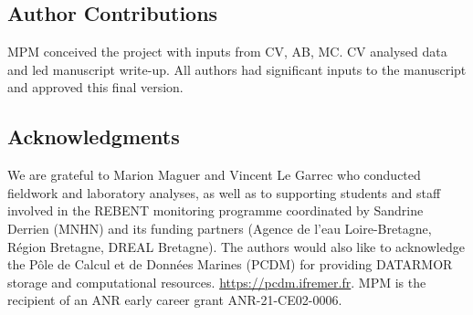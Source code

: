\documentclass[9pt,biorxiv,doublespacing,lineno]{lapreprint}
\begin{document}
\hypertarget{author-contributions}{%
\subsection{Author Contributions}\label{author-contributions}}

MPM conceived the project with inputs from CV, AB, MC. CV analysed data
and led manuscript write-up. All authors had significant inputs to the
manuscript and approved this final version.

\hypertarget{acknowledgments}{%
\subsection{Acknowledgments}\label{acknowledgments}}

We are grateful to Marion Maguer and Vincent Le Garrec who conducted
fieldwork and laboratory analyses, as well as to supporting students and
staff involved in the REBENT monitoring programme coordinated by
Sandrine Derrien (MNHN) and its funding partners (Agence de l'eau
Loire-Bretagne, Région Bretagne, DREAL Bretagne). The authors would also
like to acknowledge the Pôle de Calcul et de Données Marines (PCDM) for
providing DATARMOR storage and computational resources.
\url{https://pcdm.ifremer.fr}. MPM is the recipient of an ANR early
career grant ANR-21-CE02-0006.

\if@endfloat\clearpage\processdelayedfloats\clearpage\fi 

\printbibliography[heading=bibintoc, title={References}]





\end{document}
